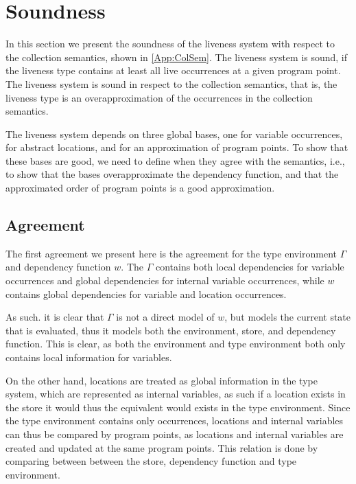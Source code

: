 \documentclass[../../master.tex]{subfiles}
\begin{document}
\section{Soundness}
In this section we present the soundness of the liveness system with respect to the collection semantics, shown in \cref{App:ColSem}.
The liveness system is sound, if the liveness type contains at least all live occurrences at a given program point.
The liveness system is sound in respect to the collection semantics, that is, the liveness type is an overapproximation of the occurrences in the collection semantics.

The liveness system depends on three global bases, one for variable occurrences, for abstract locations, and for an approximation of program points.
To show that these bases are good, we need to define when they agree with the semantics, i.e., to show that the bases overapproximate the dependency function, and that the approximated order of program points is a good approximation.

\subsection{Agreement}
The first agreement we present here is the agreement for the type environment $\Gamma$ and dependency function $w$.
The $\Gamma$ contains both local dependencies for variable occurrences and global dependencies for internal variable occurrences, while $w$ contains global dependencies for variable and location occurrences.

As such. it is clear that $\Gamma$ is not a direct model of $w$, but models the current state that is evaluated, thus it models both the environment, store, and dependency function.
This is clear, as both the environment and type environment both only contains local information for variables.

On the other hand, locations are treated as global information in the type system, which are represented as internal variables, as such if a location exists in the store it would thus the equivalent would exists in the type environment.
Since the type environment contains only occurrences, locations and internal variables can thus be compared by program points, as locations and internal variables are created and updated at the same program points.
This relation is done by comparing between between the store, dependency function and type environment.
\end{document}
